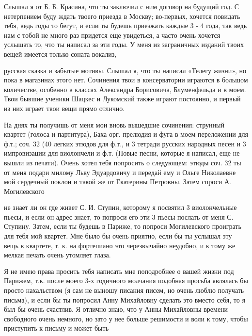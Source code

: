 Слышал я от Б. Б. Красина, что
ты заключил с ним договор на
будущий год. С нетерпением буду
ждать твоего приезда в Москву;
во-первых, хочется повидать тебя,
ведь годы то бегут, и если ты
будешь приезжать каждые 3 - 4 года,
так ведь нам с тобой не много
раз придется еще увидеться, а
часто очень хочется услышать
то, что ты написал за эти годы.
У меня из заграничных изданий твоих
вещей имеется только соната вокализ,


\noindent
русская сказка и забытые мотивы.
Слышал я, что ты написал «Телегу жизни»,
но пока в магазинах этого нет. Сочинения
твои в консерватории играются в большом количестве,
особенно в классах Александра Борисовича,
Блуменфельда и в моем. Твои бывшие
ученики Шацкес и Лукомский также
играют постоянно, и первый из них
играет твои вещи прямо отлично.

На днях ты получишь от меня мои
вновь вышедшие сочинения: струнный квартет
(голоса и партитура), Баха орг. прелюдия и
фуга  в моем переложении для
ф.т.; соч. 32 (40 легких этюдов для
ф.т., и 3 тетради русских народных песен
и 3 импровизации для виолончели
и ф.т. (Новые песни, которые я написал,
еще не вышли из печати). Очень
хотел тебя попросить о следующем:
этюды соч. 32 ты от меня подари
милому Льву Эдуардовичу и передай
ему и Ольге Николаевне мой сердечный
поклон и такой же от Екатерины Петровны.
Затем спроси А. Могилевского


\noindent
не знает ли он где живет С. И. Ступин,
которому я посвятил 3 виолончельные пьесы,
и если он адрес знает, то попроси
его эти 3 пьесы послать от
меня С. Ступину. Затем, если
ты будешь в Париже, то попроси
Могилевского проиграть для тебя
мой квартет. Мне было бы очень
приятно, если бы ты услышал
эту вещь в квартете, т. к.
на фортепиано это черезвычайно неудобно,
и к тому же мелкая печать очень
утомляет глаза.

Я не имею права просить тебя
написать мне поподробнее о вашей жизни под Парижем, т.к. после
моего 3-х годичного молчания подобная
просьба являлась бы просто нахальством
(я сам не выношу писания писем, но очень
люблю получать письма), и если бы ты
попросил Анну Михайловну сделать это
вместо себя, то я был бы очень счастлив.
Я отлично знаю, что у Анны Михайловны времени
свободного очень немного, но зато у нее
больше решимости и воли к тому,
чтобы приступить к письму и может быть


